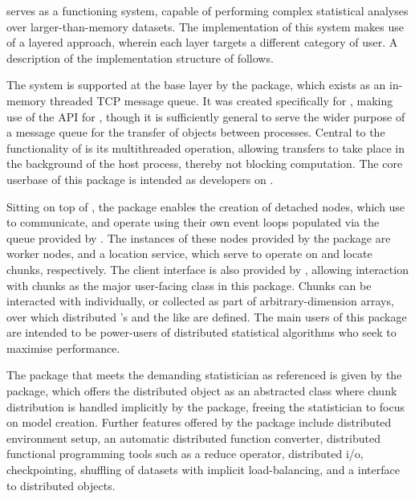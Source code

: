 \lsr{} serves as a functioning system, capable of performing complex statistical analyses over larger-than-memory datasets.
The implementation of this system makes use of a layered approach, wherein each layer targets a different category of user.
A description of the implementation structure of \lsr{} follows.

The system is supported at the base layer by the  package, which exists as an in-memory threaded TCP message queue.
It was created specifically for , making use of the  API for \R{}, though it is sufficiently general to serve the wider purpose of a message queue for the transfer of \R{} objects between \R{} processes.
Central to the functionality of  is its multithreaded operation, allowing transfers to take place in the background of the host \R{} process, thereby not blocking computation.
The core userbase of this package is intended as developers on \lsr{}.

Sitting on top of , the package  enables the creation of detached nodes, which use  to communicate, and operate using their own event loops populated via the queue provided by .
The instances of these nodes provided by the package are worker nodes, and a location service, which serve to operate on and locate chunks, respectively.
The client interface is also provided by , allowing interaction with chunks as the major user-facing class in this package.
Chunks can be interacted with individually, or collected as part of arbitrary-dimension arrays, over which distributed 's and the like are defined.
The main users of this package are intended to be power-users of distributed statistical algorithms who seek to maximise performance.

The package that meets the demanding statistician as referenced is given by the \lsr{} package, which offers the distributed object as an abstracted class where chunk distribution is handled implicitly by the package, freeing the statistician to focus on model creation. Further features offered by the package include distributed environment setup, an automatic distributed function converter, distributed functional programming tools such as a reduce operator, distributed i/o, checkpointing, shuffling of datasets with implicit load-balancing, and a  interface to distributed objects.
